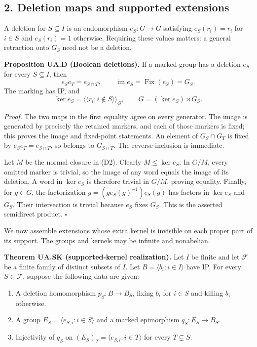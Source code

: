 \documentclass[
  11pt,
  a4paper,
]{article}
\providecommand{\tightlist}{%
  \setlength{\itemsep}{0pt}\setlength{\parskip}{0pt}}
\begin{document}
\subsection{2. Deletion maps and supported
extensions}\label{deletion-maps-and-supported-extensions}

A deletion for \(S\subseteq I\) is an endomorphism \(e_S:G\to G\)
satisfying \(e_S(r_i)=r_i\) for \(i\in S\) and \(e_S(r_i)=1\) otherwise.
Requiring these values matters: a general retraction onto \(G_S\) need
not be a deletion.

\textbf{Proposition UA.D (Boolean deletions).} If a marked group has a
deletion \(e_S\) for every \(S\subseteq I\), then \[
e_Se_T=e_{S\cap T},\qquad \operatorname{im}e_S=\operatorname{Fix}(e_S)=G_S.
\tag{D1}
\] The marking has IP, and \[
\ker e_S=\langle\!\langle r_i:i\notin S\rangle\!\rangle_G,
\qquad G=(\ker e_S)\rtimes G_S.
\tag{D2}
\]

\emph{Proof.} The two maps in the first equality agree on every
generator. The image is generated by precisely the retained markers, and
each of those markers is fixed; this proves the image and fixed-point
statements. An element of \(G_S\cap G_T\) is fixed by
\(e_Se_T=e_{S\cap T}\), so belongs to \(G_{S\cap T}\). The reverse
inclusion is immediate.

Let \(M\) be the normal closure in (D2). Clearly \(M\leq\ker e_S\). In
\(G/M\), every omitted marker is trivial, so the image of any word
equals the image of its deletion. A word in \(\ker e_S\) is therefore
trivial in \(G/M\), proving equality. Finally, for \(g\in G\), the
factorization \(g=(g e_S(g)^{-1})e_S(g)\) has factors in \(\ker e_S\)
and \(G_S\). Their intersection is trivial because \(e_S\) fixes
\(G_S\). This is the asserted semidirect product. \(\square\)

We now assemble extensions whose extra kernel is invisible on each
proper part of its support. The groups and kernels may be infinite and
nonabelian.

\textbf{Theorem UA.SK (supported-kernel realization).} Let \(I\) be
finite and let \(\mathcal F\) be a finite family of distinct subsets of
\(I\). Let \(B=\langle b_i:i\in I\rangle\) have IP. For every
\(S\in\mathcal F\), suppose the following data are given:

\begin{enumerate}
\def\labelenumi{\arabic{enumi}.}
\tightlist
\item
  A deletion homomorphism \(p_S:B\to B_S\), fixing \(b_i\) for
  \(i\in S\) and killing \(b_i\) otherwise.
\item
  A group \(E_S=\langle e_{S,i}:i\in S\rangle\) and a marked epimorphism
  \(q_S:E_S\to B_S\).
\item
  Injectivity of \(q_S\) on \((E_S)_T=\langle e_{S,i}:i\in T\rangle\)
  for every \(T\subsetneq S\).
\end{enumerate}
\end{document}
